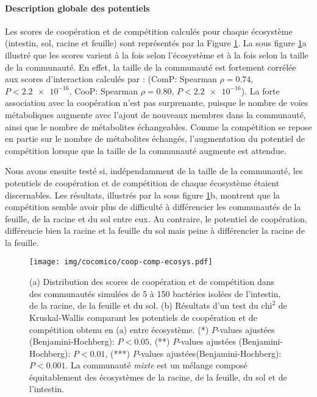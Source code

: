 \documentclass[../main.tex]{subfiles}
\begin{document}
\paragraph*{Description globale des potentiels}
Les scores de coopération et de compétition calculés pour chaque écosystème (intestin, sol, racine et feuille) sont représentés par la Figure \ref{fig:ecosystem}. La sous figure \ref{fig:ecosystem}a illustré que les scores varient à la fois selon l'écosystème et à la fois selon la taille de la communauté. En effet, la taille de la communauté est fortement corrélée aux scores d'interaction calculés par \ccmc : (\textsf{ComP}: Spearman $\rho = 0.74$, $P < \num{2.2e-16}$, 
\textsf{CooP}: Spearman $\rho = 0.80$, $P < \num{2.2e-16}$). La forte association avec la coopération n'est pas surprenante, puisque le nombre de voies métaboliques augmente avec l'ajout de nouveaux membres dans la communauté, ainsi que le nombre de métabolites échangeables. Comme la compétition se repose en partie sur le nombre de métabolites échangés, l'augmentation du potentiel de compétition lorsque que la taille de la communauté augmente est attendue. 

Nous avons ensuite testé si, indépendamment de la taille de la communauté, les potentiels de coopération et de compétition de chaque écosystème étaient discernables. Les résultats, illustrés par la sous figure \ref{fig:ecosystem}b, montrent que la compétition semble avoir plus de difficulté à différencier les communautés de la feuille, de la racine et du sol entre eux. Au contraire, le potentiel de coopération, différencie bien la racine et la feuille du sol mais peine à différencier la racine de la feuille.

\begin{figure}[H]
    \centering
    \texttt{[image: img/cocomico/coop-comp-ecosys.pdf]}
    \caption{(a) Distribution des scores de coopération et de compétition dans des communautés simulées de 5 à 150 bactéries isolées de l'intestin, de la racine, de la feuille et du sol. (b) Résultats d'un test du $\text{chi}^2$ de Kruskal-Wallis comparant les potentiels de coopération et de compétition obtenu en (a) entre écosystème.  (*)  $P$-values ajustées (Benjamini-Hochberg): $P < 0.05$,
    (**) $P$-values ajustées (Benjamini-Hochberg): $P < 0.01$,
    (***) $P$-values ajustées(Benjamini-Hochberg): $P < 0.001$. La communauté \textit{mixte} est un mélange composé équitablement des écosystèmes de la racine, de la feuille, du sol et de l'intestin. }
    \label{fig:ecosystem}
\end{figure}
\end{document}
